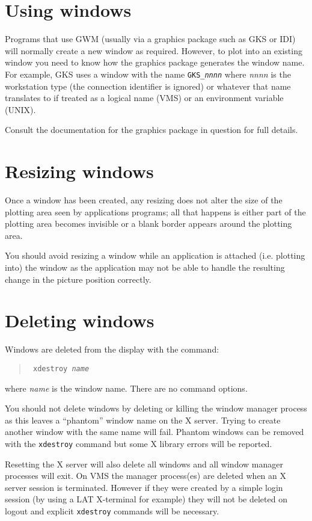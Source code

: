 \section{Using windows}

Programs that use GWM (usually via a graphics package such as GKS or IDI) will
normally create a new window as required. However, to plot into an existing
window you need to know how the graphics package generates the window name. For
example, GKS  uses a window with the name {\tt GKS\_{\em nnnn}} where {\em
nnnn} is the workstation type (the connection identifier is ignored) or
whatever that name translates to if treated as a logical name (VMS) or an
environment variable (UNIX).

Consult the documentation for the graphics package in question for full
details.

\section{Resizing windows}
Once a window has been created, any resizing does not alter the size of the
plotting area seen by applications programs; all that happens is either part of
the plotting area becomes invisible or a blank border appears around the
plotting area.

You should avoid resizing a window while an application is attached (i.e.
plotting into) the window as the application may not be able to handle the
resulting change in the picture position correctly.

\section{Deleting windows}
Windows are deleted from the display with the command:
\begin{quote}\tt
xdestroy {\em name}
\end{quote}
where {\em name} is the window name. There are no command options.

You should not delete windows by deleting or killing the window manager 
process as this leaves a ``phantom'' window name on the X server. Trying to
create another window with the same name will fail. Phantom windows can be
removed with the {\tt xdestroy} command but some X library errors will be
reported.

Resetting the X server will also delete all windows and all window manager
processes will exit. On VMS the manager process(es) are deleted when an X
server session is terminated. However if they were created by a simple login
session (by using a LAT X-terminal for example) they will not be deleted on
logout and explicit {\tt xdestroy} commands will be necessary.

